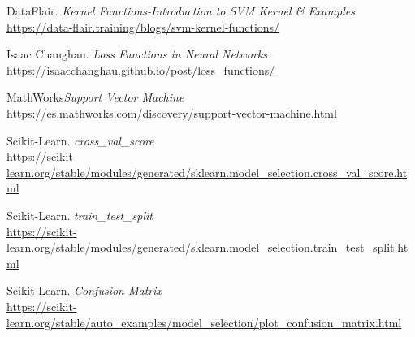 \documentclass[11pt,a4paper]{article}
\begin{document}
\begin{thebibliography}{}
    DataFlair. \textit{Kernel Functions-Introduction to SVM Kernel \& Examples}
    \\\url{https://data-flair.training/blogs/svm-kernel-functions/}
    
    Isaac Changhau. \textit{Loss Functions in Neural Networks}
    \\\url{https://isaacchanghau.github.io/post/loss_functions/}
    
    MathWorks\textit{Support Vector Machine}
    \\\url{https://es.mathworks.com/discovery/support-vector-machine.html}
    
    Scikit-Learn. \textit{cross\_val\_score}
    \\\url{https://scikit-learn.org/stable/modules/generated/sklearn.model_selection.cross_val_score.html}
    
    Scikit-Learn. \textit{train\_test\_split}
    \\\url{https://scikit-learn.org/stable/modules/generated/sklearn.model_selection.train_test_split.html}
    
    Scikit-Learn. \textit{Confusion Matrix}
    \\\url{https://scikit-learn.org/stable/auto_examples/model_selection/plot_confusion_matrix.html}
    
    \end{thebibliography}
\end{document}
